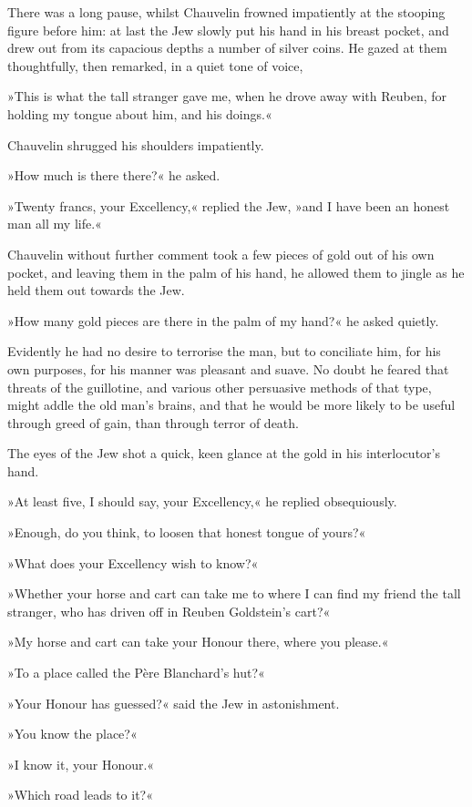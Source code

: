 There was a long pause, whilst Chauvelin frowned impatiently at the stooping figure before him: at last the Jew slowly put his hand in his breast pocket, and drew out from its capacious depths a number of silver coins. He gazed at them thoughtfully, then remarked, in a quiet tone of voice,\longdash


»This is what the tall stranger gave me, when he drove away with Reuben, for holding my tongue about him, and his doings.«

Chauvelin shrugged his shoulders impatiently.

»How much is there there?« he asked.

»Twenty francs, your Excellency,« replied the Jew, »and I have been an honest man all my life.«

Chauvelin without further comment took a few pieces of gold out of his own pocket, and leaving them in the palm of his hand, he allowed them to jingle as he held them out towards the Jew.

»How many gold pieces are there in the palm of my hand?« he asked quietly.

Evidently he had no desire to terrorise the man, but to conciliate him, for his own purposes, for his manner was pleasant and suave. No doubt he feared that threats of the guillotine, and various other persuasive methods of that type, might addle the old man's brains, and that he would be more likely to be useful through greed of gain, than through terror of death.

The eyes of the Jew shot a quick, keen glance at the gold in his interlocutor's hand.

»At least five, I should say, your Excellency,« he replied obsequiously.

»Enough, do you think, to loosen that honest tongue of yours?«

»What does your Excellency wish to know?«

»Whether your horse and cart can take me to where I can find my friend the tall stranger, who has driven off in Reuben Goldstein's cart?«

»My horse and cart can take your Honour there, where you please.«

»To a place called the Père Blanchard's hut?«

»Your Honour has guessed?« said the Jew in astonishment.

»You know the place?«

»I know it, your Honour.«

»Which road leads to it?«

